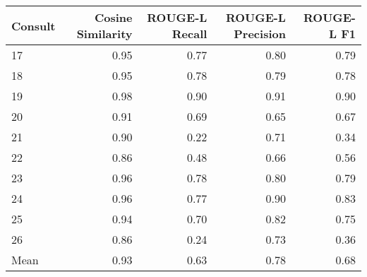 \begin{tabular}{lrrrr}
\toprule
Consult & Cosine Similarity & ROUGE-L Recall & ROUGE-L Precision & ROUGE-L F1 \\
\midrule
17 & 0.95 & 0.77 & 0.80 & 0.79 \\
18 & 0.95 & 0.78 & 0.79 & 0.78 \\
19 & 0.98 & 0.90 & 0.91 & 0.90 \\
20 & 0.91 & 0.69 & 0.65 & 0.67 \\
21 & 0.90 & 0.22 & 0.71 & 0.34 \\
22 & 0.86 & 0.48 & 0.66 & 0.56 \\
23 & 0.96 & 0.78 & 0.80 & 0.79 \\
24 & 0.96 & 0.77 & 0.90 & 0.83 \\
25 & 0.94 & 0.70 & 0.82 & 0.75 \\
26 & 0.86 & 0.24 & 0.73 & 0.36 \\
Mean & 0.93 & 0.63 & 0.78 & 0.68 \\
\bottomrule
\end{tabular}

